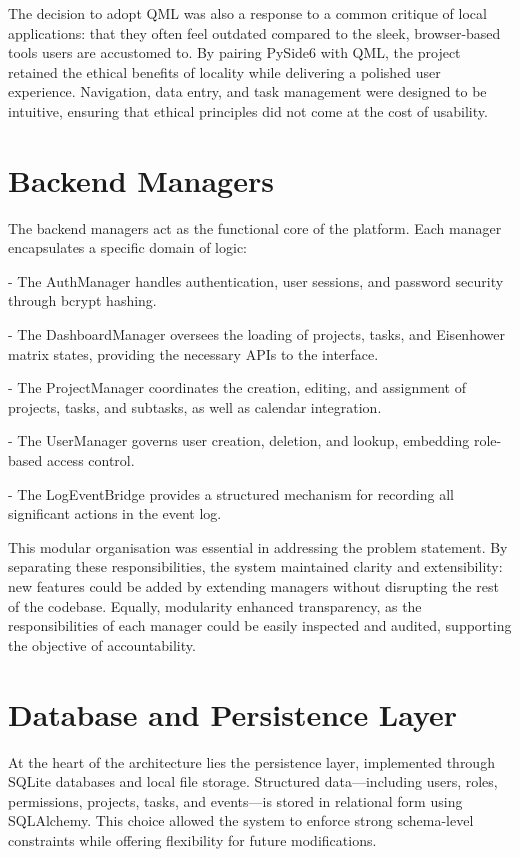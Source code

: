 \documentclass{report}
\begin{document}
The decision to adopt QML was also a response to a common critique of local applications: that they often feel outdated compared to the sleek, browser-based tools users are accustomed to. 
By pairing PySide6 with QML, the project retained the ethical benefits of locality while delivering a polished user experience. 
Navigation, data entry, and task management were designed to be intuitive, ensuring that ethical principles did not come at the cost of usability.

\section{Backend Managers}

The backend managers act as the functional core of the platform. Each manager encapsulates a specific domain of logic:

- The AuthManager handles authentication, user sessions, and password security through bcrypt hashing.

- The DashboardManager oversees the loading of projects, tasks, and Eisenhower matrix states, providing the necessary APIs to the interface.

- The ProjectManager coordinates the creation, editing, and assignment of projects, tasks, and subtasks, as well as calendar integration.

- The UserManager governs user creation, deletion, and lookup, embedding role-based access control.

- The LogEventBridge provides a structured mechanism for recording all significant actions in the event log.

This modular organisation was essential in addressing the problem statement. 
By separating these responsibilities, the system maintained clarity and extensibility: new features could be added by extending managers without disrupting the rest of the codebase. 
Equally, modularity enhanced transparency, as the responsibilities of each manager could be easily inspected and audited, supporting the objective of accountability.

\section{Database and Persistence Layer}

At the heart of the architecture lies the persistence layer, implemented through SQLite databases and local file storage. 
Structured data—including users, roles, permissions, projects, tasks, and events—is stored in relational form using SQLAlchemy. 
This choice allowed the system to enforce strong schema-level constraints while offering flexibility for future modifications.
\end{document}
